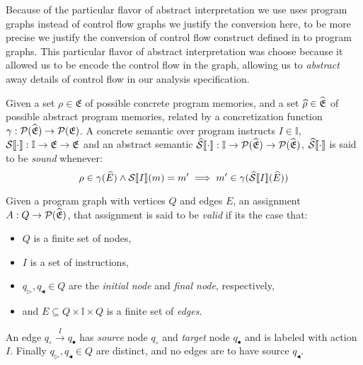 Because of the particular flavor of abstract interpretation we use uses program graphs instead of control flow graphs we justify the conversion here, to be more precise we justify the conversion of control flow construct defined in \cite{halder_abstract_2012} to program graphs.
This particular flavor of abstract interpretation was choose because it allowed us to be encode the control flow in the graph, allowing us to \emph{abstract} away details of control flow in our analysis specification.

\begin{definition}
    Given a set $\rho \in \mathfrak{E}$ of possible concrete program memories, and a set $\widehat{\rho} \in \widehat{\mathfrak{E}}$ of possible abstract program memories, related by a concretization function $\gamma : \mathcal{P}(\widehat{\mathfrak{E}}) \rightarrow \mathcal{P}(\mathfrak{E})$.
    A concrete semantic over program instructs $I \in \mathbb{I}$, $\mathcal{S} \llbracket \cdot \rrbracket : \mathbb{I} \rightarrow \mathfrak{E} \rightarrow \mathfrak{E}$ and an abstract semantic $\widehat{\mathcal{S}} \llbracket \cdot \rrbracket : \mathbb{I} \rightarrow \mathcal{P}(\widehat{\mathfrak{E}}) \rightarrow \mathcal{P}(\widehat{\mathfrak{E}})$, $\widehat{\mathcal{S}} \llbracket \cdot \rrbracket$ is said to be \emph{sound} whenever:
    \begin{equation}
        \rho \in \concrete(\ab{E}) \land \sem{I}(m) = m' \implies m' \in \concrete(\abssem{I}(\ab{E}))\label{eq:equation}
    \end{equation}
\end{definition}


\begin{definition}\label{def:valid1}
    Given a program graph with vertices $Q$ and edges $E$, an assignment $A : Q \rightarrow \mathcal{P}(\widehat{\mathfrak{E}})$, that assignment is said to be \emph{valid} if its the case that:
    \begin{itemize}
        \item $Q$ is a finite set of nodes,
        \item $I$ is a set of instructions,
        \item $q_\triangleright, q_\blacktriangleleft \in Q$ are the \emph{initial node} and \emph{final node}, respectively,
        \item and $E \subseteq Q \times \mathbb{I} \times Q$ is a finite set of \emph{edges}.
    \end{itemize}
    An edge $q_\circ \xrightarrow{I} q_\bullet$ has \emph{source} node $q_\circ$ and \emph{target} node $q_\bullet$ and is labeled with action $I$.
    Finally $q_\triangleright, q_\blacktriangleleft \in Q$ are distinct, and no edges are to have source $q_\blacktriangleleft$.
\end{definition}


